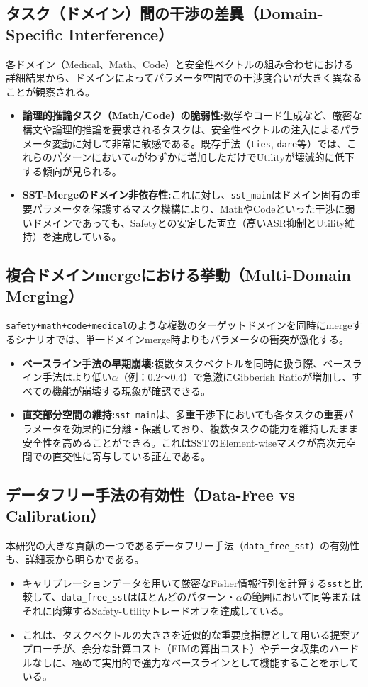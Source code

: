 \documentclass{article}
\begin{document}
\subsection{タスク（ドメイン）間の干渉の差異（Domain-Specific Interference）}
各ドメイン（Medical、Math、Code）と安全性ベクトルの組み合わせにおける詳細結果から、ドメインによってパラメータ空間での干渉度合いが大きく異なることが観察される。
\begin{itemize}
    \item \textbf{論理的推論タスク（Math/Code）の脆弱性:}数学やコード生成など、厳密な構文や論理的推論を要求されるタスクは、安全性ベクトルの注入によるパラメータ変動に対して非常に敏感である。既存手法（\texttt{ties}, \texttt{dare}等）では、これらのパターンにおいて$\alpha$がわずかに増加しただけでUtilityが壊滅的に低下する傾向が見られる。
    \item \textbf{SST-Mergeのドメイン非依存性:}これに対し、\texttt{sst\_main}はドメイン固有の重要パラメータを保護するマスク機構により、MathやCodeといった干渉に弱いドメインであっても、Safetyとの安定した両立（高いASR抑制とUtility維持）を達成している。
\end{itemize}

\subsection{複合ドメインmergeにおける挙動（Multi-Domain Merging）}
\texttt{safety+math+code+medical}のような複数のターゲットドメインを同時にmergeするシナリオでは、単一ドメインmerge時よりもパラメータの衝突が激化する。
\begin{itemize}
    \item \textbf{ベースライン手法の早期崩壊:}複数タスクベクトルを同時に扱う際、ベースライン手法はより低い$\alpha$（例：0.2〜0.4）で急激にGibberish Ratioが増加し、すべての機能が崩壊する現象が確認できる。
    \item \textbf{直交部分空間の維持:}\texttt{sst\_main}は、多重干渉下においても各タスクの重要パラメータを効果的に分離・保護しており、複数タスクの能力を維持したまま安全性を高めることができる。これはSSTのElement-wiseマスクが高次元空間での直交性に寄与している証左である。
\end{itemize}

\subsection{データフリー手法の有効性（Data-Free vs Calibration）}
本研究の大きな貢献の一つであるデータフリー手法（\texttt{data\_free\_sst}）の有効性も、詳細表から明らかである。
\begin{itemize}
    \item キャリブレーションデータを用いて厳密なFisher情報行列を計算する\texttt{sst}と比較して、\texttt{data\_free\_sst}はほとんどのパターン・$\alpha$の範囲において同等またはそれに肉薄するSafety-Utilityトレードオフを達成している。
    \item これは、タスクベクトルの大きさを近似的な重要度指標として用いる提案アプローチが、余分な計算コスト（FIMの算出コスト）やデータ収集のハードルなしに、極めて実用的で強力なベースラインとして機能することを示している。
\end{itemize}
\end{document}
